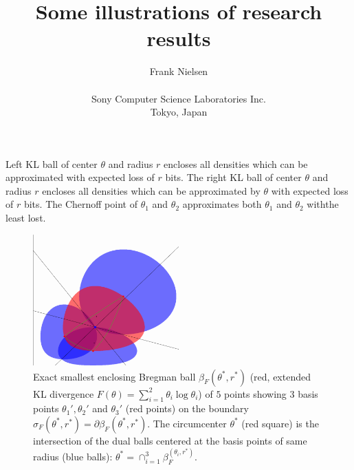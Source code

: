 \documentclass[11pt]{article}
\begin{document}
%
\title{Some illustrations of research results}

\author{Frank Nielsen\\ \ \\ Sony Computer Science Laboratories Inc.\\ Tokyo, Japan}

\date{}


\maketitle  


Left KL ball of  center $\theta$ and radius $r$   encloses all densities which can be approximated with expected loss of $r$ bits.
The right KL ball of center $\theta$ and radius $r$   encloses all densities which can be approximated by $\theta$ with expected loss of $r$ bits.
The Chernoff point of $\theta_1$ and $\theta_2$ approximates both $\theta_1$ and $\theta_2$ withthe least lost.

\begin{figure}
\centering
\includegraphics[width=0.5\textwidth]{eKLminiball-5pts-3pts-basis.png}

\caption{Exact smallest enclosing Bregman ball $\beta_F(\theta^*,r^*)$ (red, extended KL divergence $F(\theta)=\sum_{i=1}^2 \theta_i\log\theta_i$) of $5$ points showing $3$ basis points $\theta_1', \theta_2'$ and $\theta_3'$ (red points) on the boundary $\sigma_F(\theta^*,r^*)=\partial\beta_F(\theta^*,r^*)$.
The circumcenter $\theta^*$ (red square) is the intersection of the dual balls centered at the basis points of same radius (blue balls):
$\theta^*=\cap_{i=1}^3 \beta_F^(\theta_i,r^*)$.}\label{fig:minibball}

\end{figure}
\end{document}
